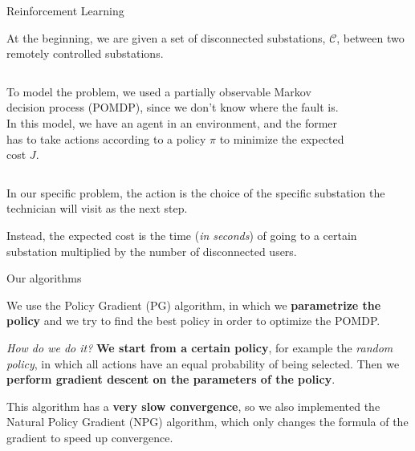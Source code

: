 \documentclass[10pt, aspectratio=169, compress, protectframetitle, handout]{beamer}
\begin{document}
\begin{frame}{Reinforcement Learning}

    At the beginning, we are given a set of disconnected substations, $\mathcal C$, between two remotely controlled substations.
    \bigskip

    \begin{columns}[onlytextwidth]
        \begin{column}{.6\textwidth}
            To model the problem, we used a \alert{partially observable Markov decision process (POMDP)}, since we don't know where the fault is. In this model, we have an \alert{agent} in an \alert{environment}, and the former has to take \alert{actions} according to a \alert{policy} $\pi$ to minimize the \alert{expected cost} $J$.
        \end{column}
        \begin{column}{.4\textwidth}
            \vspace*{-15pt}
            \begin{figure}
                \centering
                \includegraphics[width=3.5cm]{figures/POMDP-schema.png}
            \end{figure}
        \end{column}
    \end{columns}
    \medskip

    In our specific problem, the \alert{action} is the choice of the specific substation the technician will visit as the next step.
    
    Instead, the \alert{expected cost} is the time (\textit{in seconds}) of going to a certain substation multiplied by the number of disconnected users.
    
\end{frame}

\begin{frame}{Our algorithms}

    We use the \alert{Policy Gradient (PG) algorithm}, in which we \textbf{parametrize the policy} and we try to find the best policy in order to optimize the POMDP.
    
    \textit{How do we do it?} \textbf{We start from a certain policy}, for example the \emph{random policy}, in which all actions have an equal probability of being selected. Then we \textbf{perform gradient descent on the parameters of the policy}.
    
    This algorithm has a \textbf{very slow convergence}, so we also implemented the \alert{Natural Policy Gradient (NPG) algorithm}, which only changes the formula of the gradient to speed up convergence.
    
\end{frame}
\end{document}
